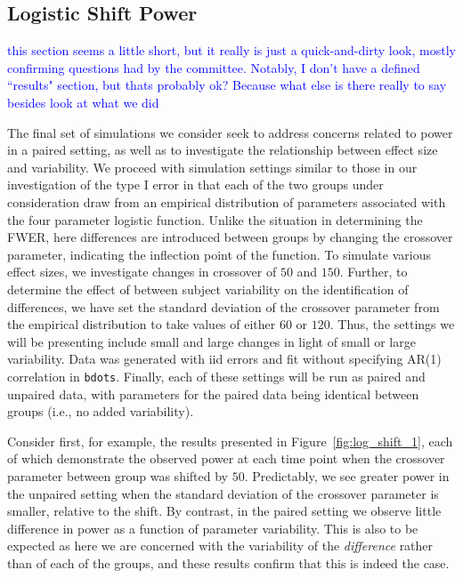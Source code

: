 \documentclass{article}
\newcommand{\xt}{\texttt}
\providecommand{\cn}[1]{\textcolor{blue}{#1}}
\begin{document}
\subsection{Logistic Shift Power}

\cn{this section seems a little short, but it really is just a quick-and-dirty look, mostly confirming questions had by the committee. Notably, I don't have a defined ``results" section, but thats probably ok? Because what else is there really to say besides look at what we did}

The final set of simulations we consider seek to address concerns related to power in a paired setting, as well as to investigate the relationship between effect size and variability. We proceed with simulation settings similar to those in our investigation of the type I error in that each of the two groups under consideration draw from an empirical distribution of parameters associated with the four parameter logistic function. Unlike the situation in determining the FWER, here differences are introduced between groups by changing the crossover parameter, indicating the inflection point of the function. To simulate various effect sizes, we investigate changes in crossover of $50$ and $150$. Further, to determine the effect of between subject variability on the identification of differences, we have set the standard deviation of the crossover parameter from the empirical distribution to take values of either $60$ or $120$. Thus, the settings we will be presenting include small and large changes in light of small or large variability. Data was generated with iid errors and fit without specifying AR(1) correlation in \xt{bdots}. Finally, each of these settings will be run as paired and unpaired data, with parameters for the paired data being identical between groups (i.e., no added variability). 


Consider first, for example, the results presented in Figure~\ref{fig:log_shift_1}, each of which demonstrate the observed power at each time point when the crossover parameter between group was shifted by $50$. Predictably, we see greater power in the unpaired setting when the standard deviation of the crossover parameter is smaller, relative to the shift. By contrast, in the paired setting we observe little difference in power as a function of parameter variability. This is also to be expected as here we are concerned with the variability of the \textit{difference} rather than of each of the groups, and these results confirm that this is indeed the case. 
\end{document}
